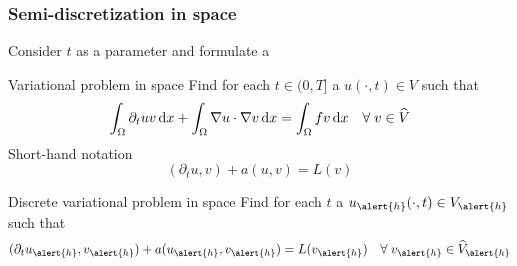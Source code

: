 \begin{frame}
  \frametitle{Semi-discretization in space}
  Consider $t$ as a parameter and formulate a
  \begin{block}{Variational problem in space}
  Find for each $t \in (0,T]$ a $u(\cdot,t) \in V$
    such that
    \begin{align*}
      \int_{\Omega} \partial_t u v \, \mathrm{d}x 
      +\int_{\Omega} \nabla u \cdot \nabla v \, \mathrm{d}x
      = \int_{\Omega} f v \, \mathrm{d}x \quad \forall \; v \in \widehat{V}
    \end{align*}
    Short-hand notation
    \begin{equation*}
      (\partial_t u, v) + a(u,v) = L(v)
    \end{equation*}
  \end{block}
  \vspace{-1.0em}
  \begin{block}{Discrete variational problem in space}
    Find for each $t$ a $u_{\alert{h}}(\cdot,t) \in V_{\alert{h}}$
    such that
    \begin{align*}
      (\partial_t u_{\alert{h}}, v_{\alert{h}}) + a(u_{\alert{h}},v_{\alert{h}}) = L(v_{\alert{h}})
      \quad \foralls v_{\alert{h}} \in \widehat{V}_{\alert{h}}
    \end{align*}
  \end{block}

    
\end{frame}

